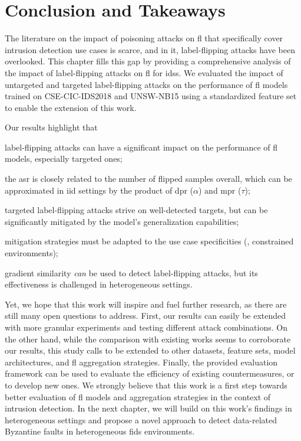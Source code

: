 \section{Conclusion and Takeaways\label{sec:assess.conclusion}}

The literature on the impact of poisoning attacks on \gls{fl} that specifically cover intrusion detection use cases is scarce, and in it, label-flipping attacks have been overlooked.
This chapter fills this gap by providing a comprehensive analysis of the impact of label-flipping attacks on \gls{fl} for \glspl{ids}.
We evaluated the impact of untargeted and targeted label-flipping attacks on the performance of \gls{fl} models trained on CSE-CIC-IDS2018 and UNSW-NB15 using a standardized feature set to enable the extension of this work.

Our results highlight that
\begin{enumerate*}[(i)]
  \item label-flipping attacks can have a significant impact on the performance of \gls{fl} models, especially targeted ones;
  \item the \gls{asr} is closely related to the number of flipped samples overall, which can be approximated in \gls{iid} settings by the product of \gls{dpr} ($\alpha$) and \gls{mpr} ($\tau$); 
  \item targeted label-flipping attacks strive on well-detected targets, but can be significantly mitigated by the model's generalization capabilities;
  \item mitigation strategies must be adapted to the use case specificities (\eg, constrained environments);
  \item gradient similarity \emph{can} be used to detect label-flipping attacks, but its effectiveness is challenged in heterogeneous settings.
\end{enumerate*}

Yet, we hope that this work will inspire and fuel further research, as there are still many open questions to address.
First, our results can easily be extended with more granular experiments and testing different attack combinations.
On the other hand, while the comparison with existing works seems to corroborate our results, this study calls to be extended to other datasets, feature sets, model architectures, and \gls{fl} aggregation strategies.
Finally, the provided evaluation framework can be used to evaluate the efficiency of existing countermeasures, or to develop new ones.
We strongly believe that this work is a first step towards better evaluation of \gls{fl} models and aggregation strategies in the context of intrusion detection.
In the next chapter, we will build on this work's findings in heterogeneous settings and propose a novel approach to detect data-related Byzantine faults in heterogeneous \gls{fids} environments.


